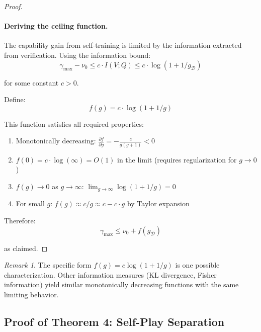\documentclass{article}
\theoremstyle{definition}
\theoremstyle{remark}
\newtheorem{remark}[theorem]{Remark}
\newcommand{\D}{\mathcal{D}}
\begin{document}
\begin{proof}
\paragraph{Deriving the ceiling function.}
The capability gain from self-training is limited by the information extracted from verification. Using the information bound:
\[
\gamma_{\max} - \nu_0 \leq c \cdot I(V; Q) \leq c \cdot \log(1 + 1/g_\D)
\]

for some constant \(c > 0\).

Define:
\[
f(g) = c \cdot \log(1 + 1/g)
\]

This function satisfies all required properties:
\begin{enumerate}
\item Monotonically decreasing: \(\frac{\partial f}{\partial g} = -\frac{c}{g(g+1)} < 0\)
\item \(f(0) = c \cdot \log(\infty) = O(1)\) in the limit (requires regularization for \(g \to 0\))
\item \(f(g) \to 0\) as \(g \to \infty\): \(\lim_{g \to \infty} \log(1 + 1/g) = 0\)
\item For small \(g\): \(f(g) \approx c/g \approx c - c \cdot g\) by Taylor expansion
\end{enumerate}

Therefore:
\[
\gamma_{\max} \leq \nu_0 + f(g_\D)
\]

as claimed.
\end{proof}

\begin{remark}
The specific form \(f(g) = c \log(1 + 1/g)\) is one possible characterization. Other information measures (KL divergence, Fisher information) yield similar monotonically decreasing functions with the same limiting behavior.
\end{remark}

\subsection{Proof of Theorem 4: Self-Play Separation}
\end{document}
